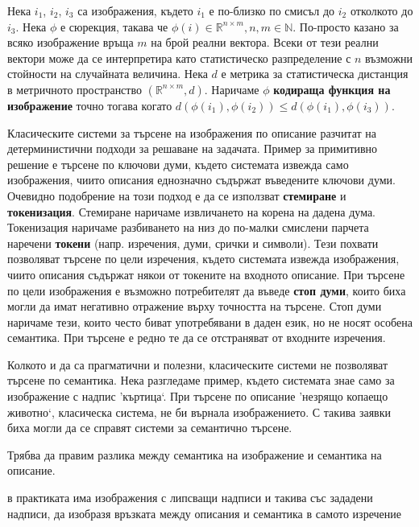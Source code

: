 \documentclass[a4paper,12pt]{article}
\begin{document}
\bigbreak

Нека $i_1$, $i_2$, $i_3$ са изображения, където $i_1$ е по-близко по смисъл до $i_2$ отколкото до $i_3$. Нека $\phi$ е сюрекция, такава че $\phi(i) \in \mathbb{R}^{n \times m}, n,m \in \mathbb{N}$. По-просто казано за всяко изображение връща $m$ на брой реални вектора. Всеки от тези реални вектори може да се интерпретира като статистическо разпределение с $n$ възможни стойности на случайната величина. Нека $d$ е метрика за статистическа дистанция в метричното пространство $(\mathbb{R}^{n \times m}, d)$. Наричаме $\phi$ \textbf{кодираща функция на изображение} точно тогава когато $d(\phi(i_1), \phi(i_2)) \leq d(\phi(i_1), \phi(i_3))$.

\bigbreak

Класическите системи за търсене на изображения по описание разчитат на детерминистични подходи за решаване на задачата. Пример за примитивно решение е търсене по ключови думи, където системата извежда само изображения, чиито описания еднозначно съдържат въведените ключови думи. Очевидно подобрение на този подход е да се използват \textbf{стемиране} и \textbf{токенизация}. Стемиране наричаме извличането на корена на дадена дума. Токенизация наричаме разбиването на низ до по-малки смислени парчета наречени \textbf{токени} (напр. изречения, думи, срички и символи). Тези похвати позволяват търсене по цели изречения, където системата извежда изображения, чиито описания съдържат някои от токените на входното описание. При търсене по цели изображения е възможно потребителят да въведе \textbf{стоп думи}, които биха могли да имат негативно отражение върху точността на търсене. Стоп думи наричаме тези, които често биват употребявани в даден език, но не носят особена семантика. При търсене е редно те да се отстраняват от входните изречения.

\bigbreak

Колкото и да са прагматични и полезни, класическите системи не позволяват търсене по семантика. Нека разгледаме пример, където системата знае само за изображение с надпис 'къртица`. При търсене по описание 'незрящо копаещо животно`, класическа система, не би върнала изображението. С такива заявки биха могли да се справят системи за семантично търсене.

\bigbreak

Трябва да правим разлика между семантика на изображение и семантика на описание. 

\bigbreak

в практиката има изображения с липсващи надписи и такива със зададени надписи, да изобразя връзката между описания и семантика в самото изречение
\end{document}
